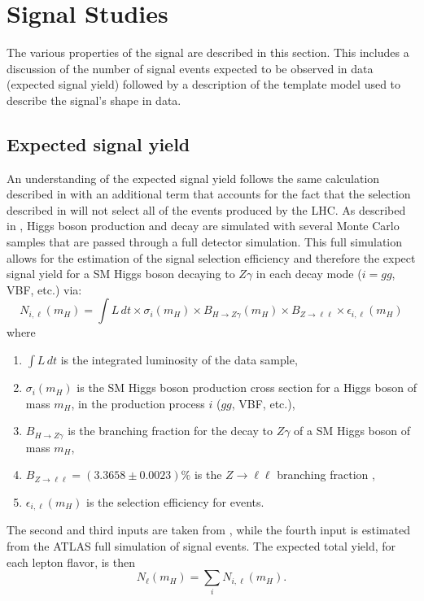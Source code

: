 \section{Signal Studies}
\label{sec:signal}
The various properties of the \HToZg signal are described in this section.
This includes a discussion of the number of signal events expected to be
observed in data (expected signal yield) followed by a description
of the template model used to describe the signal's shape in data.

\subsection{Expected signal yield}
An understanding of the expected signal yield follows the same calculation
described in  with an additional term that accounts
for the fact that the selection described in  will not
select all of the \HTollg events produced by the LHC. As described in
, Higgs boson production and decay are simulated with
several Monte Carlo samples that are passed through a full detector simulation.
This full simulation allows for the estimation of the signal selection efficiency
and therefore the expect signal yield for a SM Higgs boson decaying to $Z\gamma$
in each decay mode ($i = gg$, VBF, etc.) via:
\[
    N_{i,\ell}(m_H) = \int L\, dt \times \sigma_i(m_H) \times 
    B_{H\to Z\gamma}(m_H) \times B_{Z\to\ell\ell} \times \epsilon_{i,\ell}(m_H)
\]
where
\begin{enumerate}
 \item $\int L\, dt$ is the integrated luminosity of the data sample,
 \item $\sigma_i(m_H)$ is the SM Higgs boson production cross section for a
 Higgs boson of mass $m_H$, in the production process $i$ ($gg$, VBF, etc.),
 \item $B_{H\to Z\gamma}$ is the branching fraction for the decay to $Z\gamma$
 of a SM Higgs boson of mass $m_H$,
 \item $B_{Z\to\ell\ell} = (3.3658 \pm 0.0023)\%$ is the $Z\to\ell\ell$ branching
 fraction \cite{PDG2012},
 \item $\epsilon_{i,\ell}(m_H)$ is the selection efficiency for \HTollg events.
\end{enumerate}
The second and third inputs are taken from
\cite{LHCHiggsCrossSectionWorkingGroup:2011ti, LHCHiggsCrossSectionWorkingGroup:2012vm}, 
while the fourth input is estimated from the ATLAS full simulation of signal events.
The expected total yield, for each lepton flavor, is then 
\[
    N_{\ell}(m_H) = \sum_i N_{i,\ell}(m_H).
\]

